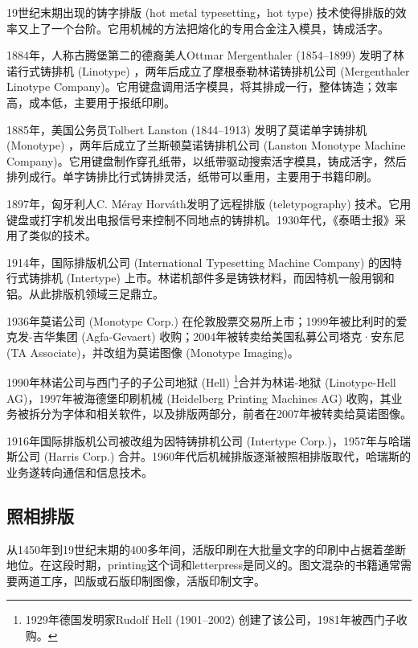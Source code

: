 19世纪末期出现的铸字排版 (hot metal typesetting，hot type) 技术使得排版的效率又上了一个台阶。它用机械的方法把熔化的专用合金注入模具，铸成活字。

1884年，人称古腾堡第二的德裔美人Ottmar Mergenthaler (1854--1899)\indexMergenthaler{} 发明了林诺行式铸排机 (Linotype) ，两年后成立了摩根泰勒林诺铸排机公司 (Mergenthaler Linotype Company)\indexLinotype{}。它用键盘调用活字模具，将其排成一行，整体铸造；效率高，成本低，主要用于报纸印刷。

1885年，美国公务员Tolbert Lanston (1844--1913)\indexLanston{} 发明了莫诺单字铸排机 (Monotype) ，两年后成立了兰斯顿莫诺铸排机公司 (Lanston Monotype Machine Company)\indexMonotypeLanston{}。它用键盘制作穿孔纸带，以纸带驱动搜索活字模具，铸成活字，然后排列成行。单字铸排比行式铸排灵活，纸带可以重用，主要用于书籍印刷。

1897年，匈牙利人C. Méray Horváth\indexMerayHorvath{}发明了远程排版 (teletypography) 技术。它用键盘或打字机发出电报信号来控制不同地点的铸排机。1930年代，《泰晤士报》采用了类似的技术。

1914年，国际排版机公司 (International Typesetting Machine Company)\indexInternationaltype{} 的因特行式铸排机 (Intertype) 上市。林诺机部件多是铸铁材料，而因特机一般用钢和铝。从此排版机领域三足鼎立。

1936年莫诺公司 (Monotype Corp.)\indexMonotype{} 在伦敦股票交易所上市；1999年被比利时的爱克发-吉华集团 (Agfa-Gevaert) 收购；2004年被转卖给美国私募公司塔克·安东尼 (TA Associate)，并改组为莫诺图像 (Monotype Imaging)\indexMonotypeImaging 。

1990年林诺公司与西门子\indexSiemens{}的子公司地狱 (Hell) \footnote{1929年德国发明家Rudolf Hell (1901--2002) 创建了该公司，1981年被西门子收购。}合并为林诺-地狱 (Lino\-type-Hell AG)，1997年被海德堡印刷机械 (Heidelberg Printing Machines AG) 收购，其业务被拆分为字体和相关软件，以及排版两部分，前者在2007年被转卖给莫诺图像。

1916年国际排版机公司被改组为因特铸排机公司 (Intertype Corp.)\indexIntertype{}，1957年与哈瑞斯公司 (Harris Corp.) 合并。1960年代后机械排版逐渐被照相排版取代，哈瑞斯的业务遂转向通信和信息技术。

\subsection{照相排版}

从1450年到19世纪末期的400多年间，活版印刷在大批量文字的印刷中占据着垄断地位。在这段时期，printing这个词和letterpress是同义的。图文混杂的书籍通常需要两道工序，凹版或石版印制图像，活版印制文字。

